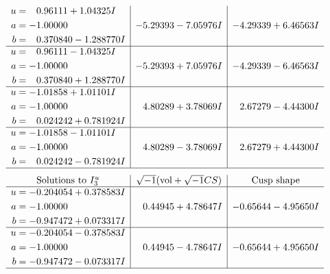 \documentclass[1p]{elsarticle_modified}
\theoremstyle{definition}
\newcommand{\I}{\sqrt{-1}}
\begin{document}
$$\begin{array}{c|c|c}
\begin{aligned}
u &= \phantom{-}0.96111 + 1.04325 I \\
a &= -1.00000\phantom{ +0.000000I} \\
b &= \phantom{-}0.370840 - 1.288770 I\end{aligned}
 & -5.29393 - 7.05976 I & -4.29339 + 6.46563 I \\ \hline\begin{aligned}
u &= \phantom{-}0.96111 - 1.04325 I \\
a &= -1.00000\phantom{ +0.000000I} \\
b &= \phantom{-}0.370840 + 1.288770 I\end{aligned}
 & -5.29393 + 7.05976 I & -4.29339 - 6.46563 I \\ \hline\begin{aligned}
u &= -1.01858 + 1.01101 I \\
a &= -1.00000\phantom{ +0.000000I} \\
b &= \phantom{-}0.024242 + 0.781924 I\end{aligned}
 & \phantom{-}4.80289 + 3.78069 I & \phantom{-}2.67279 - 4.44300 I \\ \hline\begin{aligned}
u &= -1.01858 - 1.01101 I \\
a &= -1.00000\phantom{ +0.000000I} \\
b &= \phantom{-}0.024242 - 0.781924 I\end{aligned}
 & \phantom{-}4.80289 - 3.78069 I & \phantom{-}2.67279 + 4.44300 I\\
 \hline 
 \end{array}$$\newpage$$\begin{array}{c|c|c}  
\text{Solutions to }I^u_{3}& \I (\text{vol} + \sqrt{-1}CS) & \text{Cusp shape}\\
 \hline 
\begin{aligned}
u &= -0.204054 + 0.378583 I \\
a &= -1.00000\phantom{ +0.000000I} \\
b &= -0.947472 + 0.073317 I\end{aligned}
 & \phantom{-}0.44945 + 4.78647 I & -0.65644 - 4.95650 I \\ \hline\begin{aligned}
u &= -0.204054 - 0.378583 I \\
a &= -1.00000\phantom{ +0.000000I} \\
b &= -0.947472 - 0.073317 I\end{aligned}
 & \phantom{-}0.44945 - 4.78647 I & -0.65644 + 4.95650 I\\
 \hline 
 \end{array}$$\newpage\newpage\renewcommand{\arraystretch}{1}
\end{document}

